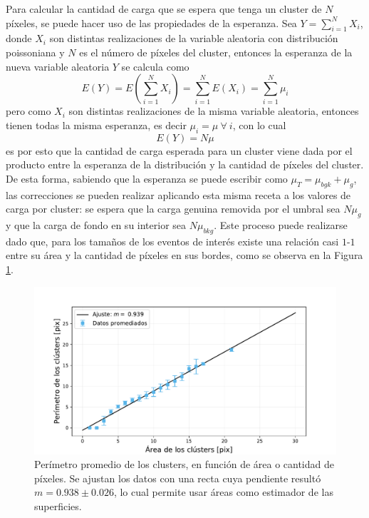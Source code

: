 Para calcular la cantidad de carga que se espera que tenga un cluster de $N$ píxeles, se puede hacer uso de las propiedades de la esperanza. Sea $Y = \sum\limits_{i = 1}^{N} X_{i}$, donde $X_{i}$ son distintas realizaciones de la variable aleatoria con distribución poissoniana y $N$ es el número de píxeles del cluster, entonces la esperanza de la nueva variable aleatoria $Y$ se calcula como
\begin{equation*}
     E(Y) = 
     E
     \left(
         \sum\limits_{i=1}^{N} X_{i}
     \right)
     = \sum\limits_{i=1}^{N}E(X_{i})
     = \sum\limits_{i=1}^{N}\mu_{i}
\end{equation*}
pero como $X_{i}$ son distintas realizaciones de la misma variable aleatoria, entonces tienen todas la misma esperanza, es decir $\mu_{i} = \mu\ \forall\ i$, con lo cual
\begin{equation*}
    E(Y) = N\mu
\end{equation*}
es por esto que la cantidad de carga esperada para un cluster viene dada por el producto entre la esperanza de la distribución y la cantidad de píxeles del cluster. De esta forma, sabiendo que la esperanza se puede escribir como $\mu_{T} = \mu_{bgk} + \mu_{g}$, las correcciones se pueden realizar aplicando esta misma receta a los valores de carga por cluster: se espera que la carga genuina removida por el umbral sea $N\mu_{g}$ y que la carga de fondo en su interior sea $N\mu_{bkg}$. Este proceso puede realizarse dado que, para los tamaños de los eventos de interés existe una relación casi $1$-$1$ entre su área y la cantidad de píxeles en sus bordes, como se observa en la Figura \ref{fig:relacion_area_perimetro}. 
\begin{figure}[h]
    \centering
    \includegraphics[scale=0.5]{Figs/clusters_perimetro_vs_area.pdf}
    \caption{Perímetro promedio de los clusters, en función de área o cantidad de píxeles. Se ajustan los datos con una recta cuya pendiente resultó $m = 0.938 \pm 0.026$, lo cual permite usar áreas como estimador de las superficies.}
    \label{fig:relacion_area_perimetro}
\end{figure}

